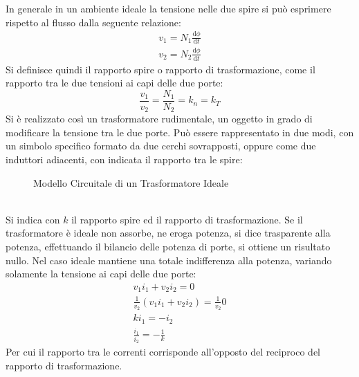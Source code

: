 \documentclass{article}
\newcommand{\df}{\mathrm{d}}
\numberwithin{equation}{subsection}
\begin{document}
In generale in un ambiente ideale la tensione nelle due spire si può esprimere rispetto al flusso dalla seguente relazione:
\begin{gather*}
    v_1=\displaystyle N_1\frac{\df\phi}{\df t}\\
    v_2=\displaystyle N_2\frac{\df\phi}{\df t}
\end{gather*}
Si definisce quindi il rapporto spire o rapporto di trasformazione, come il rapporto tra le due tensioni ai capi delle due porte:
\begin{equation}
    \displaystyle\frac{v_1}{v_2}=\frac{N_1}{N_2}=k_n=k_T
\end{equation}
Si è realizzato così un trasformatore rudimentale, un oggetto in grado di modificare la tensione tra le due porte. Può essere rappresentato in due modi, con un simbolo 
specifico formato da due cerchi sovrapposti, oppure come due induttori adiacenti, con indicata il rapporto tra le spire:
\begin{figure}[ht]%
    \centering
    \qquad
    \caption{Modello Circuitale di un Trasformatore Ideale}
    \label{fig:trasformatore-ideale}
\end{figure}
\\
Si indica con $k$ il rapporto spire ed il rapporto di trasformazione. Se il trasformatore è ideale non assorbe, ne eroga potenza, si dice trasparente alla potenza, effettuando 
il bilancio delle potenza di porte, si ottiene un risultato nullo. Nel caso ideale mantiene una totale indifferenza alla potenza, variando solamente la tensione ai capi delle 
due porte:
\begin{gather*}
    v_1i_1+v_2i_2=0\\
    \displaystyle\frac{1}{v_2}\left(v_1i_1+v_2i_2\right)=\frac{1}{v_2}0\\
    ki_1=-i_2\\
    \displaystyle\frac{i_1}{i_2}=-\frac{1}{k}
\end{gather*}
Per cui il rapporto tra le correnti corrisponde all'opposto del reciproco del rapporto di trasformazione. 
\end{document}
